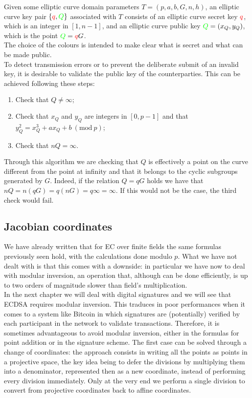 \bigskip
\noindent
Given some elliptic curve domain parameters $T = (p, a, b, G, n, h)$, an elliptic curve key pair $\{\textcolor{red}{q}, \textcolor{green}{Q}\}$ associated with $T$ consists of an elliptic curve secret key $\textcolor{red}{q}$, which is an integer in $[1, n - 1]$, and an elliptic curve public key $\textcolor{green}{Q} = (x_Q, y_Q)$, which is the point $\textcolor{green}{Q} = \textcolor{red}{q}G$.
\\
The choice of the colours is intended to make clear what is secret and what can be made public.
\\
To detect transmission errors or to prevent the deliberate submit of an invalid key, it is desirable to validate the public key of the counterparties. This can be achieved following these steps:
\begin{enumerate}
	\item Check that $Q \neq \infty$;
	\item Check that $x_Q$ and $y_Q$ are integers in $[0, p - 1]$ and that $y_Q^2 = x_Q^3 + ax_Q + b \ (\text{mod} \ p)$;
	\item Check that $nQ = \infty$.
\end{enumerate}
Through this algorithm we are checking that $Q$ is effectively a point on the curve different from the point at infinity and that it belongs to the cyclic subgroups generated by $G$. Indeed, if the relation $Q = qG$ holds we have that $nQ = n(qG) = q(nG) = q\infty = \infty$. If this would not be the case, the third check would fail.

\bigskip

\subsection{Jacobian coordinates}
\label{jac}
We have already written that for EC over finite fields the same formulas previously seen hold, with the calculations done modulo $p$. What we have not dealt with is that this comes with a downside: in particular we have now to deal with modular inversion, an operation that, although can be done efficiently, is up to two orders of magnitude slower than field's multiplication.
\\
In the next chapter we will deal with digital signatures and we will see that ECDSA requires modular inversion. This traduces in poor performances when it comes to a system like Bitcoin in which signatures are (potentially) verified by each participant in the network to validate transactions. Therefore, it is sometimes advantageous to avoid modular inversion, either in the formulas for point addition or in the signature scheme. The first case can be solved through a change of coordinates: the approach consists in writing all the points as points in a projective space, the key idea being to defer the divisions by multiplying them into a denominator, represented then as a new coordinate, instead of performing every division immediately. Only at the very end we perform a single division to convert from projective coordinates back to affine coordinates. 

